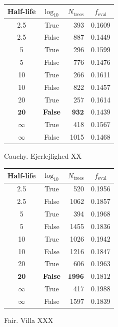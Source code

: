 \documentclass[a4paper, twoside, nobib]{tufte-book}
\begin{document}
\begin{margintable}
  \begin{tabular}{@{}ccrc@{}}
    Half-life & $\log_{10}$ & $N_\mathrm{trees}$ & $f_\mathrm{eval}$ \\
    \midrule
    \num{2.5} & True & \num{393} & \num{0.1609} \\
    \num{2.5} & False & \num{887} & \num{0.1449} \\
    \num{5} & True & \num{296} & \num{0.1599} \\
    \num{5} & False & \num{776} & \num{0.1476} \\
    \num{10} & True & \num{266} & \num{0.1611} \\
    \num{10} & False & \num{822} & \num{0.1457} \\
    \num{20} & True & \num{257} & \num{0.1614} \\
    $\mathbf{20}$ & \textbf{False} & $\mathbf{932}$ & $\mathbf{0.1439}$ \\
    $\infty$ & True & \num{418} & \num{0.1567} \\
    $\infty$ & False & \num{1015} & \num{0.1468} \\
  \end{tabular}
  \caption{\label{tab:h:HPO_initial_Cauchy}Cauchy. Ejerlejlighed XX}
\end{margintable}


\begin{margintable}
  \begin{tabular}{@{}ccrc@{}}
    Half-life & $\log_{10}$ & $N_\mathrm{trees}$ & $f_\mathrm{eval}$ \\
    \midrule
    \num{2.5} & True & \num{520} & \num{0.1956} \\
    \num{2.5} & False & \num{1062} & \num{0.1857} \\
    \num{5} & True & \num{394} & \num{0.1968} \\
    \num{5} & False & \num{1455} & \num{0.1836} \\
    \num{10} & True & \num{1026} & \num{0.1942} \\
    \num{10} & False & \num{1216} & \num{0.1847} \\
    \num{20} & True & \num{606} & \num{0.1963} \\
    $\mathbf{20}$ & \textbf{False} & $\mathbf{1996}$ & $\mathbf{0.1812}$ \\
    $\infty$ & True & \num{417} & \num{0.1988} \\
    $\infty$ & False & \num{1597} & \num{0.1839} \\
  \end{tabular}
  \caption{\label{tab:h:HPO_initial_Fair}Fair. Villa XXX}
\end{margintable}
\end{document}
